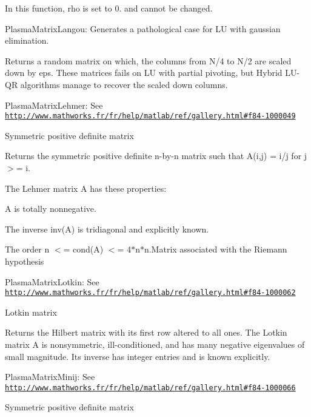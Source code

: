 In this function, rho is set to 0. and cannot be changed.

\begin{DoxyItemize}
\item Plasma\+Matrix\+Langou\+: Generates a pathological case for L\+U with gaussian elimination.\end{DoxyItemize}
Returns a random matrix on which, the columns from N/4 to N/2 are scaled down by eps. These matrices fails on L\+U with partial pivoting, but Hybrid L\+U-\/\+Q\+R algorithms manage to recover the scaled down columns.

\begin{DoxyItemize}
\item Plasma\+Matrix\+Lehmer\+: See \href{http://www.mathworks.fr/fr/help/matlab/ref/gallery.html#f84-1000049}{\tt http\+://www.\+mathworks.\+fr/fr/help/matlab/ref/gallery.\+html\#f84-\/1000049}\end{DoxyItemize}
Symmetric positive definite matrix

Returns the symmetric positive definite n-\/by-\/n matrix such that A(i,j) = i/j for j $>$= i.

The Lehmer matrix A has these properties\+:
\begin{DoxyItemize}
\item A is totally nonnegative.
\item The inverse inv(\+A) is tridiagonal and explicitly known.
\item The order n $<$= cond(\+A) $<$= 4$\ast$n$\ast$n.Matrix associated with the Riemann hypothesis
\end{DoxyItemize}

\begin{DoxyItemize}
\item Plasma\+Matrix\+Lotkin\+: See \href{http://www.mathworks.fr/fr/help/matlab/ref/gallery.html#f84-1000062}{\tt http\+://www.\+mathworks.\+fr/fr/help/matlab/ref/gallery.\+html\#f84-\/1000062}\end{DoxyItemize}
Lotkin matrix

Returns the Hilbert matrix with its first row altered to all ones. The Lotkin matrix A is nonsymmetric, ill-\/conditioned, and has many negative eigenvalues of small magnitude. Its inverse has integer entries and is known explicitly.

\begin{DoxyItemize}
\item Plasma\+Matrix\+Minij\+: See \href{http://www.mathworks.fr/fr/help/matlab/ref/gallery.html#f84-1000066}{\tt http\+://www.\+mathworks.\+fr/fr/help/matlab/ref/gallery.\+html\#f84-\/1000066}\end{DoxyItemize}
Symmetric positive definite matrix


